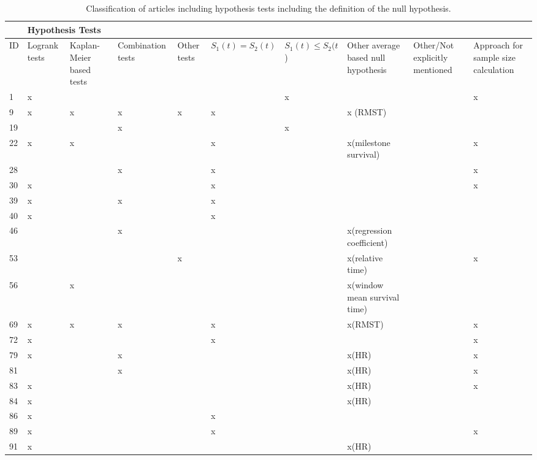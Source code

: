 \begin{landscape}
    \begin{longtable}{|p{0.3in}|p{0.4in}|p{0.4in}|p{0.4in}|p{0.3in}|p{0.4in}|p{0.4in}|p{1.0in}|p{0.65in}|p{0.8in}|}
    \caption{Classification of articles including hypothesis tests including the definition of the null hypothesis.}
    \label{tab:S4} 
    \\
    \hline 
\textbf{} & \multicolumn{4}{|p{1.8in}|}{\textbf{Hypothesis Tests}} & \textbf{} & \textbf{} & \textbf{} & \textbf{} & \textbf{} \\ \hline 
ID & Log\-rank tests\textbf{} & Kaplan-Meier based tests\textbf{} & Combi\-nation tests\textbf{} & Other tests\textbf{} & $S_1(t)=S_2(t)$ & $S_1\left(t\right)\le S_2(t$) & Other average based null hypothesis & Other/Not explicitly mentioned & Approach for sample size calculation \\ \hline 
1 & x &  &  &  &  & x &  &  & x \\ \hline 
9 & x & x & x & x & x &  & x (RMST) &  &  \\ \hline 
19 &  &  & x &  &  & x &  &  &  \\ \hline 
22 & x & x &  &  & x  &  & x(milestone survival) &  & x \\ \hline 
28 &  &  & x &  & x  &  &  &  & x \\ \hline 
30 & x &  &  &  & x &  &  &  & x \\ \hline 
39 & x &  & x &  & x &  &  &  &  \\ \hline 
40 & x &  &  &  & x &  &  &  &  \\ \hline 
46 &  &  & x &  &  &  & x(regression coefficient) &  &  \\ \hline 
53 &  &  &  & x &  &  & x(relative time) &  & x \\ \hline 
56 &  & x &  &  &  &  & x(window mean survival time) &  &  \\ \hline 
69 & x & x & x &  & x &  & x(RMST) &  & x \\ \hline 
72 & x &  &  &  & x &  &  &  & x \\ \hline 
79 & x &  & x &  &  &  & x(HR) &  & x \\ \hline 
81 &  &  & x &  &  &  & x(HR) &  & x \\ \hline 
83 & x &  &  &  &  &  & x(HR) &  & x \\ \hline 
84 & x &  &  &  &  &  & x(HR) &  &  \\ \hline 
86 & x &  &  &  & x &  &  &  &  \\ \hline 
89 & x &  &  &  & x &  &  &  & x \\ \hline 
91 & x &  &  &  &  &  & x(HR) &  &  \\ \hline 

\end{longtable}
\end{landscape}

